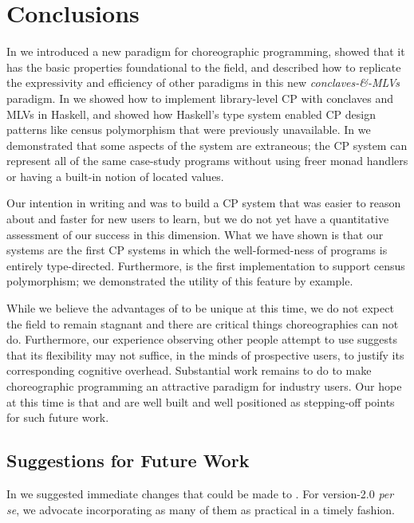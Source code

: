 \chapter{Conclusions}
\label{sec:conclusion}

In  we introduced a new paradigm for choreographic programming,
showed that it has the basic properties foundational to the field,
and described how to replicate the expressivity and efficiency of other paradigms in this new \emph{conclaves-\&-MLVs} paradigm.
In  we showed how to implement library-level CP with conclaves and MLVs in Haskell,
and showed how Haskell's type system enabled CP design patterns like census polymorphism that were previously unavailable.
In  we demonstrated that some aspects of the \MultiChor system are extraneous;
the CP system \minichor can represent all of the same case-study programs
without using freer monad handlers or having a built-in notion of located values.

Our intention in writing \HLSCentral and \MultiChor was to build a CP system that was easier to reason about
and faster for new users to learn, but we do not yet have a quantitative assessment of our success in this dimension.
What we have shown is that our systems are the first CP systems in which the well-formed-ness of programs is entirely type-directed.
Furthermore, \MultiChor is the first implementation to support census polymorphism;
we demonstrated the utility of this feature by example.

While we believe the advantages of \MultiChor to be unique at this time,
we do not expect the field to remain stagnant
and there are critical things \MultiChor choreographies can not do.
Furthermore, our experience observing other people attempt to use \MultiChor suggests
that its flexibility may not suffice, in the minds of prospective users, to justify its corresponding cognitive overhead.
Substantial work remains to do to make choreographic programming an attractive paradigm for industry users.
Our hope at this time is that \MultiChor and \minichor are well built and well positioned as stepping-off points for such future work.

\section{Suggestions for Future Work}

In  we suggested immediate changes that could be made to \MultiChor.
For version-2.0 \textit{per se}, we advocate incorporating as many of them as practical in a timely fashion.

